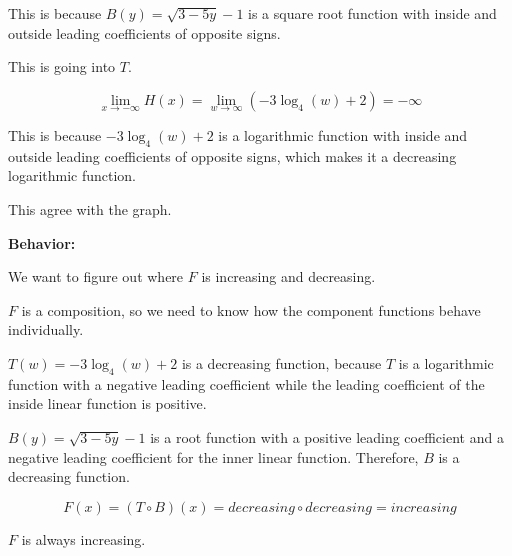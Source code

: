\documentclass{ximera}
\begin{document}
This is because $B(y) = \sqrt{3 - 5y} - 1$ is a square root function with inside and outside leading coefficients of opposite signs. 


This is going into $T$. 



\[
\lim\limits_{x \to -\infty} H(x)  = \lim\limits_{w \to \infty} (-3 \log_4(w) + 2)  = -\infty
\]


This is because $-3 \log_4(w) + 2$ is a logarithmic function with inside and outside leading coefficients of opposite signs, which makes it a decreasing logarithmic function.




This agree with the graph.  
























\textbf{\textcolor{blue!55!black}{Behavior:}} 


We want to figure out where $F$ is increasing and decreasing. 

$F$ is a composition, so we need to know how the component functions behave individually. 





$T(w) = -3 \log_4(w) + 2$ is a decreasing function, because $T$ is a logarithmic function with a negative leading coefficient while the leading coefficient of the inside linear function is  positive. 

$B(y) = \sqrt{3 - 5y} - 1$ is a root function with a positive leading coefficient and a negative leading coefficient for the inner linear function.  Therefore, $B$ is a decreasing function.





\[
F(x) = (T \circ B)(x) = decreasing \circ decreasing = increasing
\]



$F$ is always increasing. 
\end{document}
